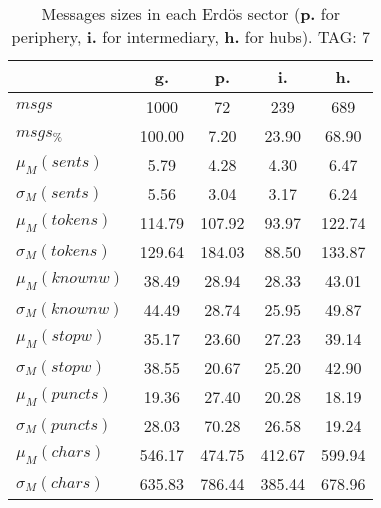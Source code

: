 \begin{table}[h!]
\begin{center}
\begin{tabular}{| l | c | c | c | c |}\hline
 & g. & p. & i. & h. \\\hline
$msgs$ & 1000  & 72  & 239  & 689 \\\hline
$msgs_{\%}$ & 100.00  & 7.20  & 23.90  & 68.90 \\\hline
$\mu_M(sents)$ & 5.79  & 4.28  & 4.30  & 6.47 \\\hline
$\sigma_M(sents)$ & 5.56  & 3.04  & 3.17  & 6.24 \\\hline
$\mu_M(tokens)$ & 114.79  & 107.92  & 93.97  & 122.74 \\\hline
$\sigma_M(tokens)$ & 129.64  & 184.03  & 88.50  & 133.87 \\\hline
$\mu_M(knownw)$ & 38.49  & 28.94  & 28.33  & 43.01 \\\hline
$\sigma_M(knownw)$ & 44.49  & 28.74  & 25.95  & 49.87 \\\hline
$\mu_M(stopw)$ & 35.17  & 23.60  & 27.23  & 39.14 \\\hline
$\sigma_M(stopw)$ & 38.55  & 20.67  & 25.20  & 42.90 \\\hline
$\mu_M(puncts)$ & 19.36  & 27.40  & 20.28  & 18.19 \\\hline
$\sigma_M(puncts)$ & 28.03  & 70.28  & 26.58  & 19.24 \\\hline
$\mu_M(chars)$ & 546.17  & 474.75  & 412.67  & 599.94 \\\hline
$\sigma_M(chars)$ & 635.83  & 786.44  & 385.44  & 678.96 \\\hline
\end{tabular}
\caption{Messages sizes in each Erd\"os sector ({{\bf p.}} for periphery, {{\bf i.}} for intermediary, {{\bf h.}} for hubs). TAG: 7}
\end{center}
\end{table}